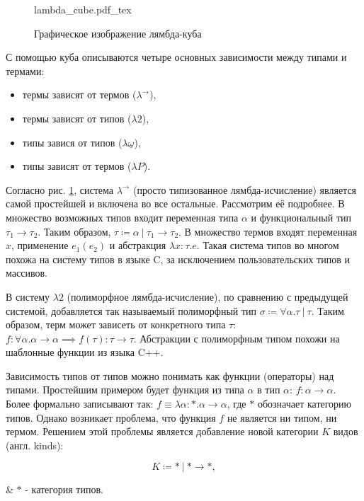 \begin{figure}[H]
    \centering
    {lambda_cube.pdf_tex}
    \caption{Графическое изображение лямбда-куба}
    \label{fig:lambda_cube}
\end{figure}

С помощью куба описываются четыре основных зависимости между типами и термами:
\begin{itemize}
    \item термы зависят от термов ($\lambda^{\to}$),
    \item термы зависят от типов ($\lambda 2$),
    \item типы завися от типов ($\lambda \underline{\omega}$),
    \item типы зависят от термов ($\lambda P$).
\end{itemize}

Согласно рис. \ref{fig:lambda_cube}, система $\lambda^{\to}$ (просто типизованное лямбда-исчисление) является самой простейшей и включена во все остальные.
Рассмотрим её подробнее.
В множество возможных типов входит переменная типа $\alpha$ и функциональный тип $\tau_1 \to \tau_2$.
Таким образом, $\tau \coloneqq \alpha ~|~ \tau_1 \to \tau_2$.
В множество термов входят переменная $x$, применение $e_1(e_2)$ и абстракция $\lambda x: \tau. e$.
Такая система типов во многом похожа на систему типов в языке C, за исключением пользовательских типов и массивов.

В систему $\lambda 2$ (полиморфное лямбда-исчисление), по сравнению с предыдущей системой, добавляется так называемый полиморфный тип $\sigma \coloneqq \forall \alpha. \tau ~|~ \tau$.
Таким образом, терм может зависеть от конкретного типа $\tau$: $f: \forall \alpha. \alpha \to \alpha \implies f(\tau): \tau \to \tau$.
Абстракции с полиморфным типом похожи на шаблонные функции из языка C++.

Зависимость типов от типов можно понимать как функции (операторы) над типами.
Простейшим примером будет функция из типа $\alpha$ в тип $\alpha$: $f: \alpha \to \alpha$.
Более формально записывают так: $f \equiv \lambda \alpha: *. \alpha \to \alpha$, где $*$ обозначает категорию типов.
Однако возникает проблема, что функция $f$ не является ни типом, ни термом.
Решением этой проблемы является добавление новой категории $K$ видов (англ. kinds):

\begin{equation}
    \label{eq:kinds}
    K \coloneqq * ~|~ * \to *,
\end{equation}
\begin{eqrem}
    & $*$ - категория типов.
\end{eqrem}

